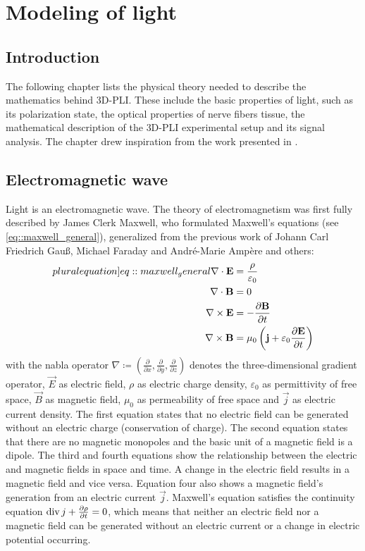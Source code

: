 \cleardoublepage
\setcounter{chapter}{2}
\chapter{Modeling of light}
\label{sec:theory}
%
\section{Introduction}
The following chapter lists the physical theory needed to describe the mathematics behind \ac{3D-PLI}.
These include the basic properties of light, such as its polarization state, the optical properties of nerve fibers tissue, the mathematical description of the \ac{3D-PLI} experimental setup and its signal analysis.
The chapter drew inspiration from the work presented in \cite{demtroeder2, Fliebach2012}.
%
%
%
\section{Electromagnetic wave}
%
Light is an electromagnetic wave.
The theory of electromagnetism was first fully described by James Clerk Maxwell, who formulated Maxwell's equations (see \cref{eq::maxwell_general}), generalized from the previous work of Johann Carl Friedrich Gau{\ss}, Michael Faraday and Andr\'{e}-Marie Amp\`{e}re and others:
%
\begin{align}
\begin{split} \label[pluralequation]{eq::maxwell_general}
    \nabla \cdot \vec{E} &= \frac {\rho} {\varepsilon_0}\\
    \nabla \cdot \vec{B} &= 0\\
    \nabla \times \vec{E} &= -\frac{\partial \vec{B}} {\partial t}\\
    \nabla \times \vec{B} &= \mu_0 \left( \vec{j} + \varepsilon_0 \frac{\partial \vec{E}} {\partial t} \right)
\end{split}
\end{align}
%
with the nabla operator $\nabla \coloneqq \left({\frac{\partial}{\partial x}}, {\frac{\partial}{\partial y}}, {\frac{\partial}{\partial z}} \right)$ denotes the three-dimensional gradient operator, $\vec{E}$ as electric field, $\rho$ as electric charge density, $\varepsilon_0$ as permittivity of free space, $\vec{B}$ as magnetic field, $\mu_0$ as permeability of free space and $\vec{j}$ as electric current density.
The first equation states that no electric field can be generated without an electric charge (conservation of charge).
The second equation states that there are no magnetic monopoles and the basic unit of a magnetic field is a dipole.
The third and fourth equations show the relationship between the electric and magnetic fields in space and time.
A change in the electric field results in a magnetic field and vice versa.
Equation four also shows a magnetic field's generation from an electric current $\vec{j}$.
Maxwell's equation satisfies the continuity equation $\operatorname{div} j + \frac{\partial \rho}{\partial t} = 0$, which means that neither an electric field nor a magnetic field can be generated without an electric current or a change in electric potential occurring.
%
%
